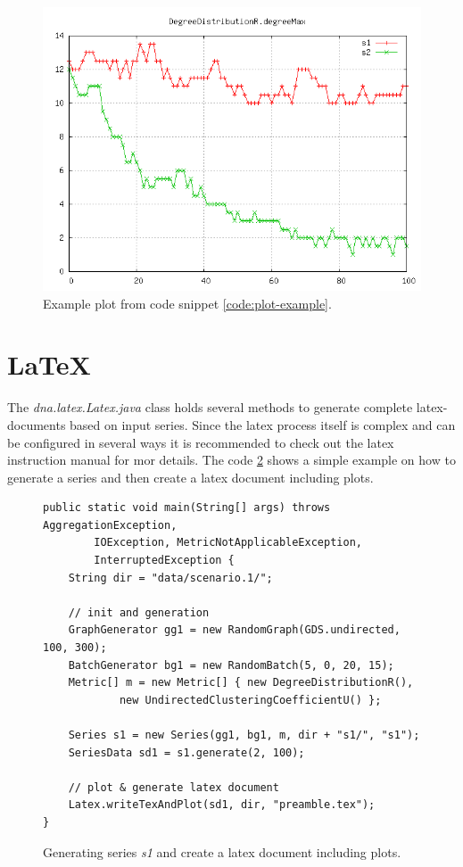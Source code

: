 \begin{figure} [h]
\centering
\includegraphics [scale=0.8] {images/plot}
\caption{Example plot from code snippet \ref{code:plot-example}.}
\label{fig:plot}
\end{figure}

\section{LaTeX}
The \textit{dna.latex.Latex.java} class holds several methods to generate complete latex-documents based on input series. Since the latex process itself is complex and can be configured in several ways it is recommended to check out the latex instruction manual for mor details. The code \ref{code:tex-example} shows a simple example on how to generate a series and then create a latex document including plots.
\begin{figure} [h]
\begin{lstlisting}
public static void main(String[] args) throws AggregationException,
		IOException, MetricNotApplicableException,
		InterruptedException {
	String dir = "data/scenario.1/";
	
	// init and generation
	GraphGenerator gg1 = new RandomGraph(GDS.undirected, 100, 300);
	BatchGenerator bg1 = new RandomBatch(5, 0, 20, 15);
	Metric[] m = new Metric[] { new DegreeDistributionR(),
			new UndirectedClusteringCoefficientU() };

	Series s1 = new Series(gg1, bg1, m, dir + "s1/", "s1");
	SeriesData sd1 = s1.generate(2, 100);

	// plot & generate latex document
	Latex.writeTexAndPlot(sd1, dir, "preamble.tex");
}
\end{lstlisting}
\caption{Generating series \textit{s1} and create a latex document including plots.}
\label{code:tex-example}
\end{figure}

